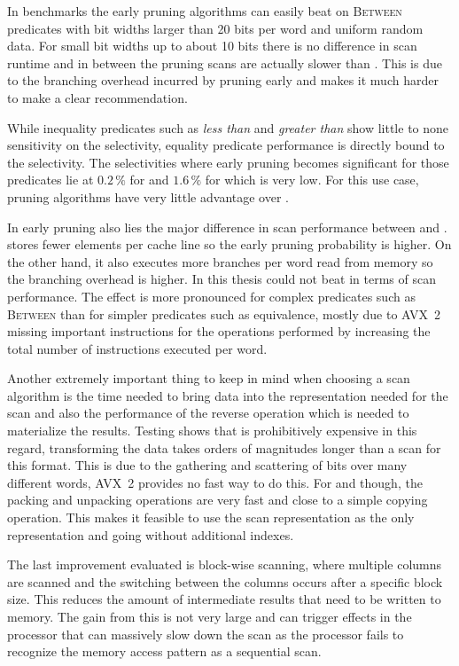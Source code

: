 In benchmarks the early pruning algorithms can easily beat \simdscan{} on
\textsc{Between} predicates with bit widths larger than 20 bits per word and
uniform random data. For small bit widths up to about 10 bits there is no
difference in scan runtime and in between the pruning scans are actually slower
than \simdscan{}. This is due to the branching overhead incurred by pruning
early and makes it much harder to make a clear recommendation.

While inequality predicates such as \emph{less than} and \emph{greater than}
show little to none sensitivity on the selectivity, equality predicate
performance is directly bound to the selectivity. The selectivities where early
pruning becomes significant for those predicates lie at $0.2\,\%$ for \bwv{} and
$1.6\,\%$ for \bs{} which is very low. For this use case, pruning algorithms have
very little advantage over \simdscan{}.

In early pruning also lies the major difference in scan performance between
\bwv{} and \bs{}. \bs{} stores fewer elements per cache line so the early
pruning probability is higher. On the other hand, it also executes more
branches per word read from memory so the branching overhead is higher. In this
thesis \bs{} could not beat \bwv{} in terms of scan performance. The effect is
more pronounced for complex predicates such as \textsc{Between} than for
simpler predicates such as equivalence, mostly due to AVX~2 missing important
instructions for the operations performed by \bs{} increasing the total number
of instructions executed per word.

Another extremely important thing to keep in mind when choosing a scan
algorithm is the time needed to bring data into the representation needed for
the scan and also the performance of the reverse operation which is needed to
materialize the results. Testing shows that \bwv{} is prohibitively expensive
in this regard, transforming the data takes orders of magnitudes longer than a
scan for this format. This is due to the gathering and scattering of bits over
many different words, AVX~2 provides no fast way to do this. For \simdscan{}
and \bs{} though, the packing and unpacking operations are very fast and close
to a simple copying operation. This makes it feasible to use the scan
representation as the only representation and going without additional indexes.

The last improvement evaluated is block-wise scanning, where multiple columns
are scanned and the switching between the columns occurs after a specific block
size. This reduces the amount of intermediate results that need to be written
to memory. The gain from this is not very large and can trigger effects in the
processor that can massively slow down the scan as the processor fails to
recognize the memory access pattern as a sequential scan.

